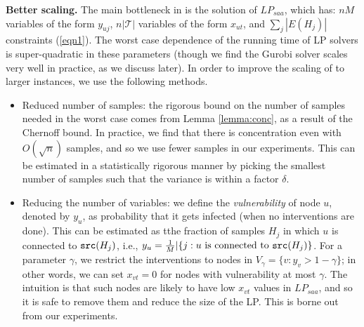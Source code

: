 \noindent
\textbf{Better scaling.}
The main bottleneck in \algo{} is the solution of $LP_{saa}$, which has: 
$nM$ variables of the form $y_{uj}$, $n|\mathcal{T}|$ variables of the form $x_{ut}$,
and $\sum_j |E(H_j)|$ constraints (\ref{eqn1}).
The worst case dependence of the running time of LP solvers is super-quadratic in these parameters
(though we find the Gurobi solver \cite{gurobi} scales very well in practice, as we discuss later).
In order to improve the scaling of \algo{} to larger instances, we use the following methods.
\begin{itemize}
\item
Reduced number of samples: the rigorous bound on the number of samples needed in the worst case comes
from Lemma \ref{lemma:conc}, as a result of the Chernoff bound.
In practice, we find that there is concentration even with $O(\sqrt{n})$ samples, and so we
use fewer samples in our experiments. This can be estimated in a statistically rigorous manner by 
picking the smallest number of samples such that the variance is within a factor $\delta$.
\item
Reducing the number of variables: 
we define the \emph{vulnerability} of node $u$, denoted by $y_u$, as probability that it gets infected
(when no interventions are done).
This can be estimated as tthe fraction of samples $H_j$ in which $u$ is connected to $\texttt{src}(H_j)$,
i.e., $y_u=\frac{1}{M}|\{j: \mbox{$u$ is connected to $\texttt{src}(H_j)$}\}$.
For a parameter $\gamma$, we restrict the interventions to nodes in $V_{\gamma}=\{v: y_v > 1-\gamma\}$;
in other words, we can set $x_{vt}=0$ for nodes with vulnerability at most $\gamma$.
The intuition is that such nodes are likely to have low $x_{vt}$ values in $LP_{saa}$,
and so it is safe to remove them and reduce the size of the LP. This is borne out from our experiments.
\end{itemize}
